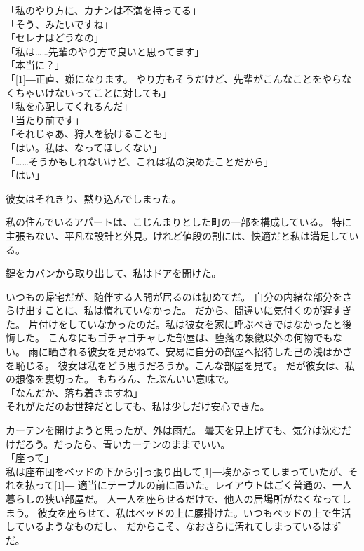 \documentclass[../IHMain]{subfiles}
\begin{document}
「私のやり方に、カナンは不満を持ってる」\\
「そう、みたいですね」\\
「セレナはどうなの」\\
「私は……先輩のやり方で良いと思ってます」\\
「本当に？」\\
「\scalebox{3}[1]{―}正直、嫌になります。
やり方もそうだけど、先輩がこんなことをやらなくちゃいけないってことに対しても」\\
「私を心配してくれるんだ」\\
「当たり前です」\\
「それじゃあ、狩人を続けることも」\\
「はい。私は、なってほしくない」\\
「……そうかもしれないけど、これは私の決めたことだから」\\
「はい」

彼女はそれきり、黙り込んでしまった。

私の住んでいるアパートは、こじんまりとした町の一部を構成している。
特に主張もない、平凡な設計と外見。けれど値段の割には、快適だと私は満足している。

鍵をカバンから取り出して、私はドアを開けた。

いつもの帰宅だが、随伴する人間が居るのは初めてだ。
自分の内緒な部分をさらけ出すことに、私は慣れていなかった。
だから、間違いに気付くのが遅すぎた。
片付けをしていなかったのだ。私は彼女を家に呼ぶべきではなかったと後悔した。
こんなにもゴチャゴチャした部屋は、堕落の象徴以外の何物でもない。
雨に晒される彼女を見かねて、安易に自分の部屋へ招待した己の浅はかさを恥じる。
彼女は私をどう思うだろうか。こんな部屋を見て。
だが彼女は、私の想像を裏切った。
もちろん、たぶんいい意味で。\\
「なんだか、落ち着きますね」\\
それがただのお世辞だとしても、私は少しだけ安心できた。

カーテンを開けようと思ったが、外は雨だ。
曇天を見上げても、気分は沈むだけだろう。だったら、青いカーテンのままでいい。\\
「座って」\\
私は座布団をベッドの下から引っ張り出して\scalebox{3}[1]{―}埃かぶってしまっていたが、それを払って\scalebox{3}[1]{―}
適当にテーブルの前に置いた。レイアウトはごく普通の、一人暮らしの狭い部屋だ。
人一人を座らせるだけで、他人の居場所がなくなってしまう。
彼女を座らせて、私はベッドの上に腰掛けた。いつもベッドの上で生活しているようなものだし、
だからこそ、なおさらに汚れてしまっているはずだ。
\end{document}
